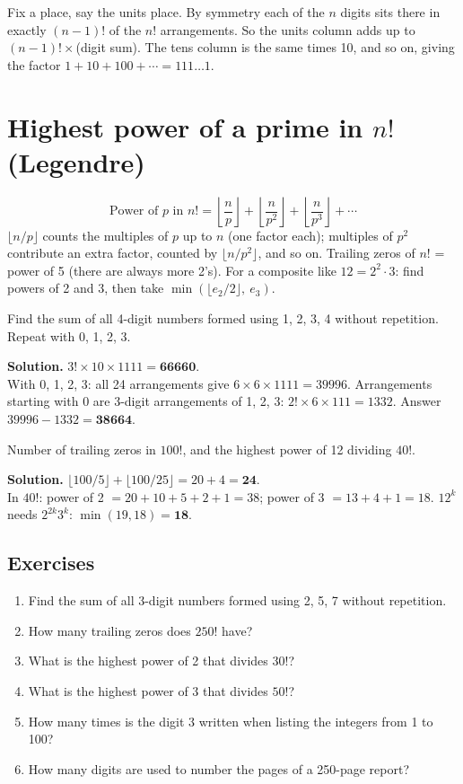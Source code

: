 \documentclass[11pt,a4paper,openany]{report}
\newenvironment{exercises}{\subsection*{Exercises \thechapter}\begin{enumerate}[label=\textbf{\thechapter.\arabic*},leftmargin=3.2em]}{\end{enumerate}}
\begin{document}
\begin{why}
Fix a place, say the units place. By symmetry each of the $n$ digits sits there in exactly $(n-1)!$ of
the $n!$ arrangements. So the units column adds up to $(n-1)!\times$(digit sum). The tens column is the same
times 10, and so on, giving the factor $1+10+100+\cdots=111\ldots1$.
\end{why}

\section{Highest power of a prime in $n!$ (Legendre)}
\[\text{Power of } p \text{ in } n! = \left\lfloor\frac np\right\rfloor+\left\lfloor\frac n{p^2}\right\rfloor+\left\lfloor\frac n{p^3}\right\rfloor+\cdots\]
$\lfloor n/p\rfloor$ counts the multiples of $p$ up to $n$ (one factor each); multiples of $p^2$ contribute an
extra factor, counted by $\lfloor n/p^2\rfloor$, and so on.
Trailing zeros of $n!$ = power of 5 (there are always more 2's).
For a composite like $12=2^2\cdot3$: find powers of 2 and 3, then take $\min(\lfloor e_2/2\rfloor,\ e_3)$.

\begin{example}
Find the sum of all 4-digit numbers formed using 1, 2, 3, 4 without repetition. Repeat with 0, 1, 2, 3.

\textbf{Solution.} $3!\times10\times1111=\mathbf{66660}$.\\
With 0, 1, 2, 3: all 24 arrangements give $6\times6\times1111=39996$. Arrangements starting with 0
are 3-digit arrangements of 1, 2, 3: $2!\times6\times111=1332$. Answer $39996-1332=\mathbf{38664}$.
\end{example}

\begin{example}
Number of trailing zeros in $100!$, and the highest power of 12 dividing $40!$.

\textbf{Solution.} $\lfloor100/5\rfloor+\lfloor100/25\rfloor=20+4=\mathbf{24}$.\\
In $40!$: power of 2 $=20+10+5+2+1=38$; power of 3 $=13+4+1=18$. $12^k$ needs $2^{2k}3^k$:
$\min(19,18)=\mathbf{18}$.
\end{example}

\begin{exercises}
\item Find the sum of all 3-digit numbers formed using 2, 5, 7 without repetition.
\item How many trailing zeros does $250!$ have?
\item What is the highest power of 2 that divides $30!$?
\item What is the highest power of 3 that divides $50!$?
\item How many times is the digit 3 written when listing the integers from 1 to 100?
\item How many digits are used to number the pages of a 250-page report?
\end{exercises}
\end{document}
